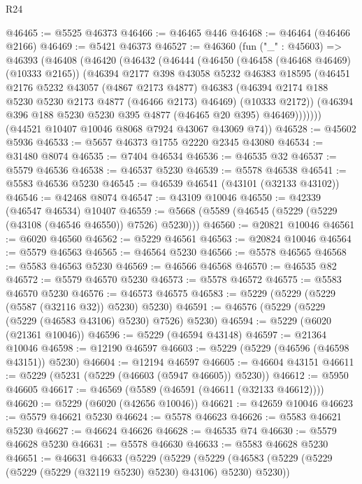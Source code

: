 \begin{lexlean}{R24}
\begin{coremodule}
@46465 := @5525 @46373
@46466 := @46465 @446
@46468 := @46464 (@46466 @2166)
@46469 := @5421 @46373
@46527 := @46360
    (fun ("_" : @45603) =>
    @46393
      (@46408
        (@46420
          (@46432
            (@46444
              (@46450
                (@46458 (@46468 @46469) (@10333 @2165))
                (@46394
                  @2177
                  @398
                  @43058
                  @5232
                  @46383
                  @18595
                  (@46451
                    @2176
                    @5232
                    @43057
                    (@4867 @2173 @4877)
                    @46383
                    (@46394 @2174 @188 @5230 @5230 @2173 @4877 (@46466 @2173) @46469)
                    (@10333 @2172))
                  (@46394 @396 @188 @5230 @5230 @395 @4877 (@46465 @20 @395) @46469)))))))
      (@44521 @10407 @10046 @8068 @7924 @43067 @43069 @74))
@46528 := @45602 @5936
@46533 := @5657 @46373 @1755 @2220 @2345 @43080
@46534 := @31480 @8074
@46535 := @7404 @46534
@46536 := @46535 @32
@46537 := @5579 @46536
@46538 := @46537 @5230
@46539 := @5578 @46538
@46541 := @5583 @46536 @5230
@46545 := @46539 @46541 (@43101 (@32133 @43102))
@46546 := @42468 @8074
@46547 := @43109 @10046
@46550 := @42339 (@46547 @46534) @10407
@46559 := @5668 (@5589 (@46545 (@5229 (@5229 (@43108 (@46546 @46550)) @7526) @5230)))
@46560 := @20821 @10046
@46561 := @6020 @46560
@46562 := @5229 @46561
@46563 := @20824 @10046
@46564 := @5579 @46563
@46565 := @46564 @5230
@46566 := @5578 @46565
@46568 := @5583 @46563 @5230
@46569 := @46566 @46568
@46570 := @46535 @82
@46572 := @5579 @46570 @5230
@46573 := @5578 @46572
@46575 := @5583 @46570 @5230
@46576 := @46573 @46575
@46583 := @5229 (@5229 (@5229 (@5587 (@32116 @32)) @5230) @5230)
@46591 := @46576 (@5229 (@5229 (@5229 (@46583 @43106) @5230) @7526) @5230)
@46594 := @5229 (@6020 (@21361 @10046))
@46596 := @5229 (@46594 @43148)
@46597 := @21364 @10046
@46598 := @12190 @46597
@46603 := @5229 (@5229 (@46596 (@46598 @43151)) @5230)
@46604 := @12194 @46597
@46605 := @46604 @43151
@46611 := @5229 (@5231 (@5229 (@46603 (@5947 @46605)) @5230))
@46612 := @5950 @46605
@46617 := @46569 (@5589 (@46591 (@46611 (@32133 @46612))))
@46620 := @5229 (@6020 (@42656 @10046))
@46621 := @42659 @10046
@46623 := @5579 @46621 @5230
@46624 := @5578 @46623
@46626 := @5583 @46621 @5230
@46627 := @46624 @46626
@46628 := @46535 @74
@46630 := @5579 @46628 @5230
@46631 := @5578 @46630
@46633 := @5583 @46628 @5230
@46651 := @46631
    @46633
    (@5229
      (@5229
        (@5229
          (@46583 (@5229 (@5229 (@5229 (@5229 (@32119 @5230) @5230) @43106) @5230) @5230))

\end{coremodule}
\end{lexlean}
